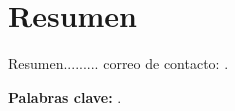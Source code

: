 
\chapter*{Resumen}
\label{cha:resumen}


Resumen......... correo de contacto: \contactauthor.

\textbf{Palabras clave:} \mybookpalabrasclave.



